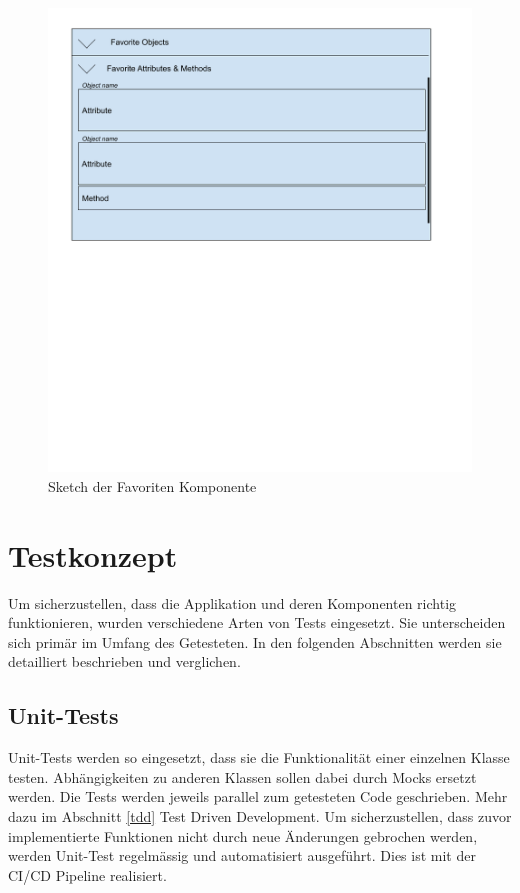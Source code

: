\begin{figure}
   \centering
   \includegraphics[width=1.0\textwidth]{gfx/Favorites Sketch.png}
   \caption{
      Sketch der Favoriten Komponente
      }
      \label{fig:favoritesSketch}
\end{figure}

\pagebreak
\section{Testkonzept}
Um sicherzustellen, dass die Applikation und deren Komponenten richtig funktionieren, wurden verschiedene Arten von Tests eingesetzt.
Sie unterscheiden sich primär im Umfang des Getesteten. 
In den folgenden Abschnitten werden sie detailliert beschrieben und verglichen.

\subsection{Unit-Tests}
Unit-Tests werden so eingesetzt, dass sie die Funktionalität einer einzelnen Klasse testen.
Abhängigkeiten zu anderen Klassen sollen dabei durch Mocks ersetzt werden.
Die Tests werden jeweils parallel zum getesteten Code geschrieben.
Mehr dazu im Abschnitt \ref{tdd} Test Driven Development.
Um sicherzustellen, dass zuvor implementierte Funktionen nicht durch neue Änderungen gebrochen werden, werden Unit-Test regelmässig und automatisiert ausgeführt.
Dies ist mit der CI/CD Pipeline realisiert.


